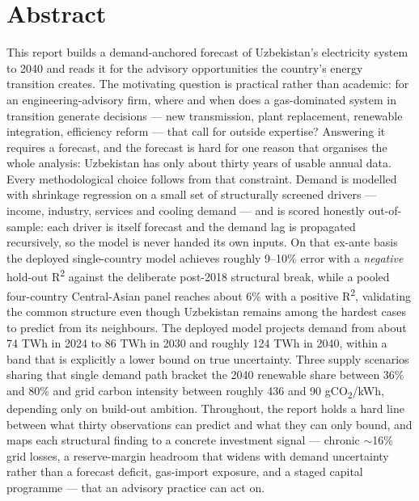 \documentclass[10pt,twocolumn]{article}
\begin{document}
\vspace{0.3in}
\clearpage
\begingroup\titlespacing*{\section}{0pt}{4pt}{4pt}
\section*{Abstract}
This report builds a demand-anchored forecast of Uzbekistan's electricity system to 2040 and reads it for the advisory opportunities the country's energy transition creates. The motivating question is practical rather than academic: for an engineering-advisory firm, where and when does a gas-dominated system in transition generate decisions --- new transmission, plant replacement, renewable integration, efficiency reform --- that call for outside expertise? Answering it requires a forecast, and the forecast is hard for one reason that organises the whole analysis: Uzbekistan has only about thirty years of usable annual data. Every methodological choice follows from that constraint. Demand is modelled with shrinkage regression on a small set of structurally screened drivers --- income, industry, services and cooling demand --- and is scored honestly out-of-sample: each driver is itself forecast and the demand lag is propagated recursively, so the model is never handed its own inputs. On that ex-ante basis the deployed single-country model achieves roughly 9--10\% error with a \textit{negative} hold-out R\textsuperscript{2} against the deliberate post-2018 structural break, while a pooled four-country Central-Asian panel reaches about 6\% with a positive R\textsuperscript{2}, validating the common structure even though Uzbekistan remains among the hardest cases to predict from its neighbours. The deployed model projects demand from about 74 TWh in 2024 to 86 TWh in 2030 and roughly 124 TWh in 2040, within a band that is explicitly a lower bound on true uncertainty. Three supply scenarios sharing that single demand path bracket the 2040 renewable share between 36\% and 80\% and grid carbon intensity between roughly 436 and 90 gCO\textsubscript{2}/kWh, depending only on build-out ambition. Throughout, the report holds a hard line between what thirty observations can predict and what they can only bound, and maps each structural finding to a concrete investment signal --- chronic $\sim$16\% grid losses, a reserve-margin headroom that widens with demand uncertainty rather than a forecast deficit, gas-import exposure, and a staged capital programme --- that an advisory practice can act on.
\end{document}
